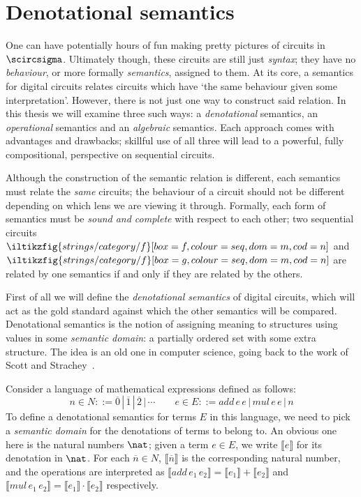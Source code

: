 \chapter{Denotational semantics}

One can have potentially hours of fun making pretty pictures of circuits in
\(\scircsigma\).
Ultimately though, these circuits are still just \emph{syntax}; they have no
\emph{behaviour}, or more formally \emph{semantics}, assigned to them.
At its core, a semantics for digital circuits relates circuits which have `the
same behaviour given some interpretation'.
However, there is not just one way to construct said relation.
In this thesis we will examine three such ways: a \emph{denotational} semantics,
an \emph{operational} semantics and an \emph{algebraic} semantics.
Each approach comes with advantages and drawbacks; skillful use of all three
will lead to a powerful, fully compositional, perspective on sequential
circuits.

Although the construction of the semantic relation is different, each semantics
must relate the \emph{same} circuits; the behaviour of a circuit should not be
different depending on which lens we are viewing it through.
Formally, each form of semantics must be \emph{sound and complete} with respect
to each other; two sequential circuits \(
    \iltikzfig{strings/category/f}[box=f,colour=seq,dom=m,cod=n]
\) and \(
    \iltikzfig{strings/category/f}[box=g,colour=seq,dom=m,cod=n]
\) are related by one semantics if and only if they are related by the others.

First of all we will define the \emph{denotational semantics} of digital
circuits, which will act as the gold standard against which the other
semantics will be compared.
Denotational semantics is the notion of assigning meaning to structures using
values in some \emph{semantic domain}: a partially ordered set with some
extra structure.
The idea is an old one in computer science, going back to the work of Scott and
Strachey~\cite{scott1970outline,scott1971mathematical}.

\begin{example}
    Consider a language of mathematical expressions defined as
    follows:
    \[
        n \in N ::= \overline{0} \,|\, \overline{1} \,|\, \overline{2} \,|\,
        \cdots
        \qquad
        e \in E ::= add \, e \, e \,|\, mul \, e \, e \,|\,  n
    \]
    To define a denotational semantics for terms \(E\) in this language, we need
    to pick a \emph{semantic domain} for the denotations of terms to belong to.
    An obvious one here is the natural numbers \(\nat\); given a term
    \(e \in E\), we write \(\llbracket{e}\rrbracket\) for its denotation in
    \(\nat\).
    For each \(\overline{n} \in N\), \(\llbracket{\overline{n}}\rrbracket\) is
    the corresponding natural number, and the operations are interpreted as \(
        \llbracket{add \, e_1 \, e_2}\rrbracket
        = \llbracket{e_1}\rrbracket + \llbracket{e_2}\rrbracket
    \) and \(
        \llbracket{mul \, e_1 \, e_2}\rrbracket
        = \llbracket{e_1}\rrbracket \cdot \llbracket{e_2}\rrbracket
    \) respectively.
\end{example}

